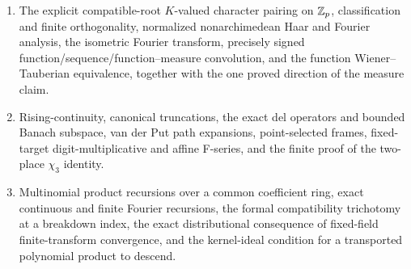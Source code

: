 \begin{enumerate}[label=\textup{(\arabic*)}]
      functional equations in $\Re s>\sigma_q$; unique meromorphic
      continuation to $\C$; a rigorous candidate-pole set; and corrected
      $q=3$ principal parts and negative-integer residue recurrence.
\item The explicit compatible-root $K$-valued character pairing on $\mathbb Z_p$,
      classification and finite orthogonality, normalized nonarchimedean Haar
      and Fourier analysis, the isometric Fourier transform, precisely signed
      function/sequence/function--measure convolution, and the function
      Wiener--Tauberian equivalence, together with the one proved direction
      of the measure claim.
\item Rising-continuity, canonical truncations, the exact del operators and
      bounded Banach subspace, van der Put path expansions, point-selected
      frames, fixed-target digit-multiplicative and affine F-series, and the
      finite proof of the two-place $\chi_3$ identity.
\item Multinomial product recursions over a common coefficient ring, exact
      continuous and finite Fourier recursions, the formal compatibility
      trichotomy at a breakdown index, the exact distributional consequence
      of fixed-field finite-transform convergence, and the kernel-ideal
      condition for a transported polynomial product to descend.
\end{enumerate}

